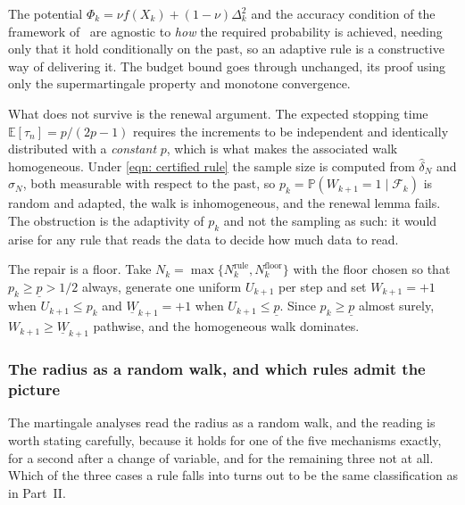 \documentclass[11pt]{article}
\theoremstyle{plain}
\theoremstyle{definition}
\theoremstyle{remark}
\numberwithin{equation}{section}
\providecommand{\E}{\mathbb{E}}
\providecommand{\Prob}{\mathbb{P}}
\providecommand{\calF}{\mathcal{F}}
\begin{document}
The potential $\Phi_k = \nu f(X_k) + (1-\nu)\Delta_k^2$ and the accuracy condition of the
framework of~\citet{ChenMenickellyScheinberg18} are agnostic to \emph{how} the required
probability is achieved, needing only that it hold conditionally on the past, so an adaptive rule
is a constructive way of delivering it. The budget bound goes through unchanged, its proof using
only the supermartingale property and monotone convergence.

What does not survive is the renewal argument. The expected stopping time
$\E[\tau_n] = p/(2p-1)$ requires the increments to be independent and identically distributed with
a \emph{constant} $p$, which is what makes the associated walk homogeneous. Under
\eqref{eqn: certified rule} the sample size is computed from $\hat\delta_N$ and $\hat\sigma_N$,
both measurable with respect to the past, so
$p_k = \Prob(W_{k+1} = 1 \mid \calF_k)$ is random and adapted, the walk is inhomogeneous, and the
renewal lemma fails. The obstruction is the adaptivity of $p_k$ and not the sampling as such: it
would arise for any rule that reads the data to decide how much data to read.

The repair is a floor. Take $N_k = \max\{N_k^{\text{rule}}, N_k^{\text{floor}}\}$ with the floor
chosen so that $p_k \geq \underline p > 1/2$ always, generate one uniform $U_{k+1}$ per step and
set $W_{k+1} = +1$ when $U_{k+1} \leq p_k$ and $\underline W_{k+1} = +1$ when
$U_{k+1} \leq \underline p$. Since $p_k \geq \underline p$ almost surely, $W_{k+1} \geq
\underline W_{k+1}$ pathwise, and the homogeneous walk dominates.

\subsubsection{The radius as a random walk, and which rules admit the picture}

The martingale analyses read the radius as a random walk, and the reading is worth stating
carefully, because it holds for one of the five mechanisms exactly, for a second after a change
of variable, and for the remaining three not at all. Which of the three cases a rule falls into
turns out to be the same classification as in Part~II.
\end{document}
